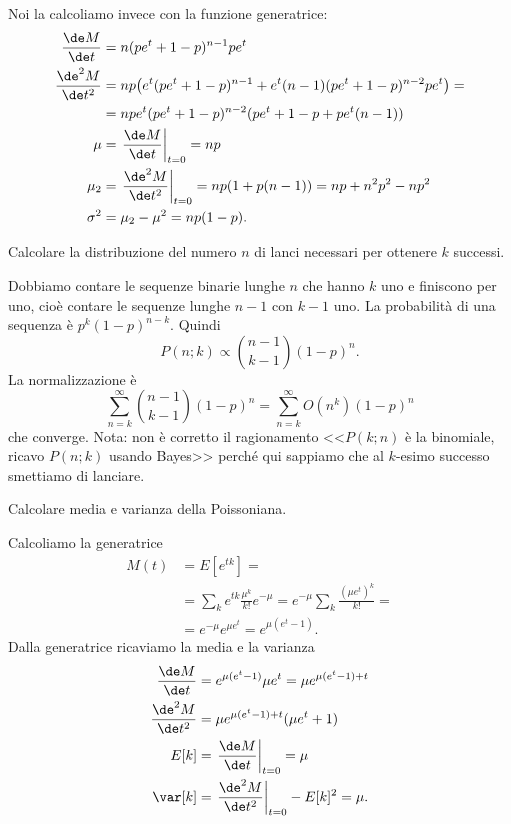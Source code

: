Noi la calcoliamo invece con la funzione generatrice:
\begin{align*}
	\frac{\de M}{\de t} &=
	n(pe^t + 1 - p)^{n-1}pe^t \\
	\frac{\de^2 M}{\de t^2} &=
	np \big(e^t(pe^t + 1-p)^{n-1} + e^t(n-1)(pe^t+1-p)^{n-2}pe^t\big) = \\
	&= npe^t(pe^t + 1-p)^{n-2}(pe^t+1-p + pe^t(n-1)) \\
	\mu &= \left. \frac{\de M}{\de t} \right|_{t=0} = np \\
	\mu_2 &= \left. \frac{\de^2 M}{\de t^2} \right|_{t=0} = np(1 + p(n-1)) = np + n^2p^2 - np^2 \\
	\sigma^2 &= \mu_2 - \mu^2 = np(1-p).
\end{align*}

\begin{exercise}
	Calcolare la distribuzione del numero $n$ di lanci necessari per ottenere $k$ successi.
\end{exercise}

\begin{solution}
	Dobbiamo contare le sequenze binarie lunghe $n$ che hanno $k$ uno e finiscono per uno,
	cioè contare le sequenze lunghe $n-1$ con $k-1$ uno.
	La probabilità di una sequenza è $p^k(1-p)^{n-k}$.
	Quindi
	\begin{equation*}
		P(n;k) \propto \binom{n-1}{k-1} (1-p)^n.
	\end{equation*}
	La normalizzazione è
	\begin{equation*}
		\sum_{n=k}^\infty \binom{n-1}{k-1} (1-p)^n =
		\sum_{n=k}^\infty O(n^k) (1-p)^n
	\end{equation*}
	che converge.
	Nota: non è corretto il ragionamento
	<<$P(k;n)$ è la binomiale, ricavo $P(n;k)$ usando Bayes>>
	perché qui sappiamo che al $k$-esimo successo smettiamo di lanciare.
\end{solution}

\begin{exercise}
	Calcolare media e varianza della Poissoniana.
\end{exercise}

\begin{solution*}
	Calcoliamo la generatrice
	\begin{align*}
		M(t) &= E[e^{tk}] = \\
		&= \sum_k e^{tk} \frac{\mu^k}{k!} e^{-\mu} =
		e^{-\mu} \sum_k \frac{(\mu e^t)^k}{k!} = \\
		&= e^{-\mu} e^{\mu e^t} = e^{\mu(e^t - 1)}.
	\end{align*}
	Dalla generatrice ricaviamo la media e la varianza
	\begin{align*}
		\frac{\de M}{\de t} &= e^{\mu(e^t-1)}\mu e^t = \mu e^{\mu(e^t-1) + t} \\
		\frac{\de^2 M}{\de t^2} &= \mu e^{\mu(e^t-1) + t} (\mu e^t + 1) \\
		E[k] &= \left. \frac{\de M}{\de t} \right|_{t=0} = \mu \\
		\var[k] &= \left. \frac{\de^2 M}{\de t^2} \right|_{t=0} - E[k]^2 = \mu.
	\end{align*}
\end{solution*}

